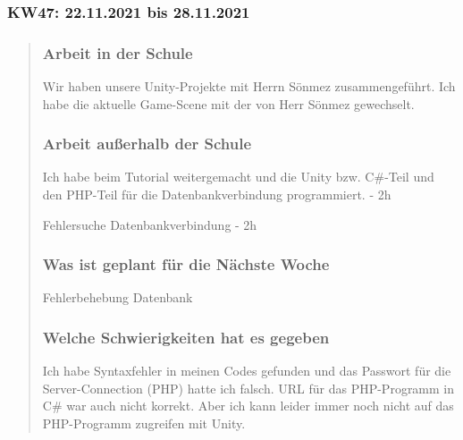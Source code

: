 
\subsubsection{KW47: 22.11.2021 bis 28.11.2021}
\begin{quote}
	\subsubsection*{Arbeit in der Schule}
	Wir haben unsere Unity-Projekte mit Herrn Sönmez zusammengeführt. Ich habe die aktuelle Game-Scene mit der von Herr Sönmez gewechselt. 
	
	\subsubsection*{Arbeit außerhalb der Schule}
	Ich habe beim Tutorial weitergemacht und die Unity bzw. C\#-Teil und den PHP-Teil für die Datenbankverbindung programmiert. - 2h
		
	Fehlersuche Datenbankverbindung - 2h
	
	\subsubsection*{Was ist geplant für die Nächste Woche}
	Fehlerbehebung Datenbank
	
	\subsubsection*{Welche Schwierigkeiten hat es gegeben}
	Ich habe Syntaxfehler in meinen Codes gefunden und das Passwort für die Server-Connection (PHP) hatte ich falsch. URL für das PHP-Programm in C\# war auch nicht korrekt. Aber ich kann leider immer noch nicht auf das PHP-Programm zugreifen mit Unity.
	
\end{quote}
